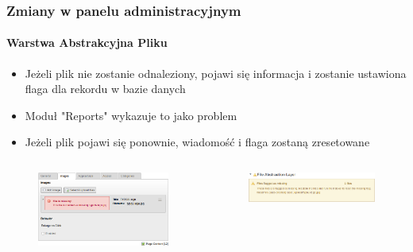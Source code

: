 \begin{frame}[fragile]
	\frametitle{Zmiany w panelu administracyjnym}
	\framesubtitle{Warstwa Abstrakcyjna Pliku}

	\begin{itemize}
		\item Jeżeli plik nie zostanie odnaleziony, pojawi się informacja i zostanie ustawiona flaga dla rekordu w bazie danych
		\item Moduł "Reports" wykazuje to jako problem
		\item Jeżeli plik pojawi się ponownie, wiadomość i flaga zostaną zresetowane
	\end{itemize}

	\begin{columns}[T]

		\begin{column}{.5\textwidth}
			\begin{figure}
				\includegraphics[width=0.95\linewidth]{Images/BackendChanges/FalMissingFileContentElement.png}
			\end{figure}
		\end{column}

		\begin{column}{.5\textwidth}
			\begin{figure}
				\includegraphics[width=0.95\linewidth]{Images/BackendChanges/FalMissingFileReportsModule.png}
			\end{figure}
		\end{column}

	\end{columns}

\end{frame}

